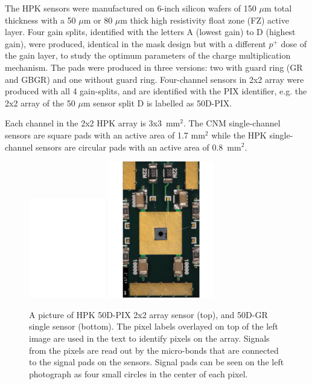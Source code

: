 \documentclass[preprint,1p]{elsarticle}
\begin{document}
The HPK sensors were manufactured on 6-inch silicon wafers of 150 $\mu$m total
thickness with a 50 $\mu$m or 80 $\mu$m thick high resistivity float zone (FZ)
active layer. Four gain splits, identified with the letters A (lowest gain) to D
(highest gain), were produced, identical in the mask design but with a different
$p^+$ dose of the gain layer, to study the optimum parameters of the charge
multiplication mechanism. The pads were produced in three versions: two with
guard ring (GR and GBGR) and one without guard ring. Four-channel sensors in 2x2
array were produced with all 4 gain-splits, and are identified with the PIX
identifier, e.g. the 2x2 array of the 50 $\mu$m sensor split D is labelled as
50D-PIX. 

Each channel in the 2x2 HPK array is 3x3~mm$^2$. The CNM single-channel sensors
are square pads with an active area of 1.7 mm$^2$ while the HPK single-channel
sensors are circular pads with an active area of 0.8~mm$^2$.

\begin{figure}[!htbp] 
\centering
\includegraphics[width=0.3\textwidth]{figs/HPK-50DPix.pdf} 
\includegraphics[width=0.41\textwidth]{figs/HPK-50D.pdf} 
\caption{A picture of HPK 50D-PIX 2x2 array sensor (top), and 50D-GR single sensor (bottom). The pixel labels overlayed on top of the left image are used in the text to identify pixels on the array. Signals from the pixels are read out by the micro-bonds that are connected to the signal pads on the sensors. Signal pads can be seen on the left photograph as four small circles in the center of each pixel. } 
\label{fig:HPK_Sensors} 
\end{figure} 
\end{document}
